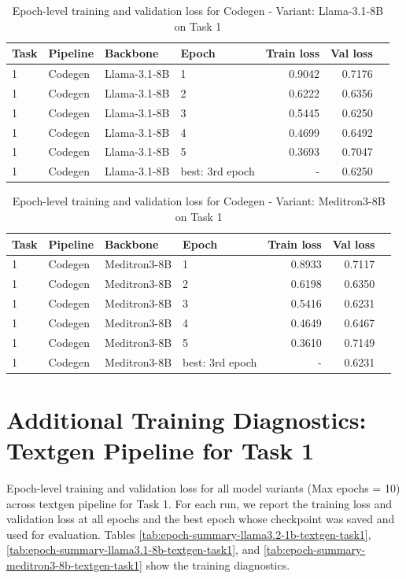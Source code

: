 \begin{table}[t]
    \centering
    \caption{Epoch-level training and validation loss for Codegen - Variant: Llama-3.1-8B on Task 1}
    \label{tab:epoch-summary-llama3.1-8b-codegen}
    \begin{tabular}{llllrrr}
        \toprule
        Task & Pipeline & Backbone & Epoch & Train loss & Val loss \\
        \midrule
        1 & Codegen & Llama-3.1-8B   & 1   & 0.9042 & 0.7176 \\
        1 & Codegen & Llama-3.1-8B   & 2   & 0.6222 & 0.6356 \\
        1 & Codegen & Llama-3.1-8B   & 3   & 0.5445 & 0.6250 \\
        1 & Codegen & Llama-3.1-8B   & 4   & 0.4699 & 0.6492 \\
        1 & Codegen & Llama-3.1-8B   & 5   & 0.3693 & 0.7047 \\
        \midrule
        1 & Codegen & Llama-3.1-8B   & best: 3rd epoch & - & 0.6250 \\
        \bottomrule
    \end{tabular}
\end{table}

\begin{table}[t]
    \centering
    \caption{Epoch-level training and validation loss for Codegen - Variant: Meditron3-8B on Task 1}
    \label{tab:epoch-summary-meditron3-8b-codegen}
    \begin{tabular}{llllrrr}
        \toprule
        Task & Pipeline & Backbone & Epoch & Train loss & Val loss \\
        \midrule
        1 & Codegen & Meditron3-8B   & 1   & 0.8933 & 0.7117 \\
        1 & Codegen & Meditron3-8B   & 2   & 0.6198 & 0.6350 \\
        1 & Codegen & Meditron3-8B   & 3   & 0.5416 & 0.6231 \\
        1 & Codegen & Meditron3-8B   & 4   & 0.4649 & 0.6467 \\
        1 & Codegen & Meditron3-8B   & 5   & 0.3610 & 0.7149 \\
        \midrule
        1 & Codegen & Meditron3-8B   & best: 3rd epoch & - & 0.6231 \\
        \bottomrule
    \end{tabular}
\end{table}

\section{Additional Training Diagnostics: Textgen Pipeline for Task 1}
\label{app:training-diagnostics-textgen-task1}
Epoch-level training and validation loss for all model variants (Max epochs = 10) across textgen pipeline for Task 1. For each run, we report the training loss and validation loss at all epochs and the best epoch whose checkpoint was saved and used for evaluation.
Tables \ref{tab:epoch-summary-llama3.2-1b-textgen-task1}, \ref{tab:epoch-summary-llama3.1-8b-textgen-task1}, and \ref{tab:epoch-summary-meditron3-8b-textgen-task1} show the training diagnostics.

